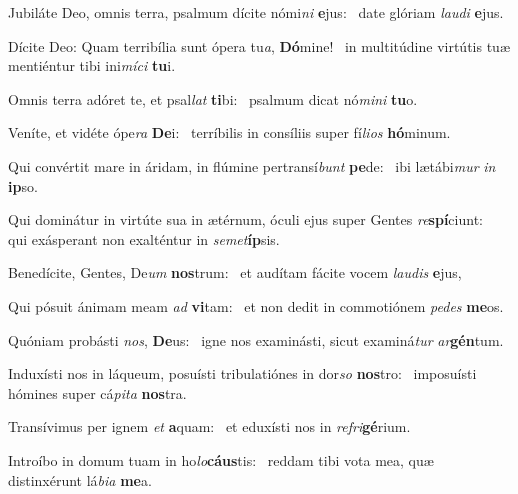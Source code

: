 \item Jubiláte Deo, omnis terra, psalmum dícite nómi\textit{ni} \textbf{e}jus:~\psstar{} date glóriam \textit{laudi} \textbf{e}jus.

\item Dícite Deo: Quam terribília sunt ópera tu\textit{a}, \textbf{Dó}mine!~\psstar{} in multitúdine virtútis tuæ mentiéntur tibi ini\textit{míci} \textbf{tu}i.

\item Omnis terra adóret te, et psal\textit{lat} \textbf{ti}bi:~\psstar{} psalmum dicat nó\textit{mini} \textbf{tu}o.

\item Veníte, et vidéte ópe\textit{ra} \textbf{De}i:~\psstar{} terríbilis in consíliis super fí\textit{lios} \textbf{hó}minum.

\item Qui convértit mare in áridam, in flúmine pertransí\textit{bunt} \textbf{pe}de:~\psstar{} ibi lætábi\textit{mur} \textit{in} \textbf{ip}so.

\item Qui dominátur in virtúte sua in ætérnum, óculi ejus super Gentes \textit{re}\textbf{spí}ciunt:~\psstar{} qui exásperant non exalténtur in \textit{semet}\textbf{íp}sis.

\item Benedícite, Gentes, De\textit{um} \textbf{nos}trum:~\psstar{} et audítam fácite vocem \textit{laudis} \textbf{e}jus,

\item Qui pósuit ánimam meam \textit{ad} \textbf{vi}tam:~\psstar{} et non dedit in commotiónem \textit{pedes} \textbf{me}os.

\item Quóniam probásti \textit{nos}, \textbf{De}us:~\psstar{} igne nos examinásti, sicut examiná\textit{tur} \textit{ar}\textbf{gén}tum.

\item Induxísti nos in láqueum, posuísti tribulatiónes in dor\textit{so} \textbf{nos}tro:~\psstar{} imposuísti hómines super cá\textit{pita} \textbf{nos}tra.

\item Transívimus per ignem \textit{et} \textbf{a}quam:~\psstar{} et eduxísti nos in \textit{refri}\textbf{gé}rium.

\item Introíbo in domum tuam in ho\textit{lo}\textbf{cáus}tis:~\psstar{} reddam tibi vota mea, quæ distinxérunt lá\textit{bia} \textbf{me}a.

